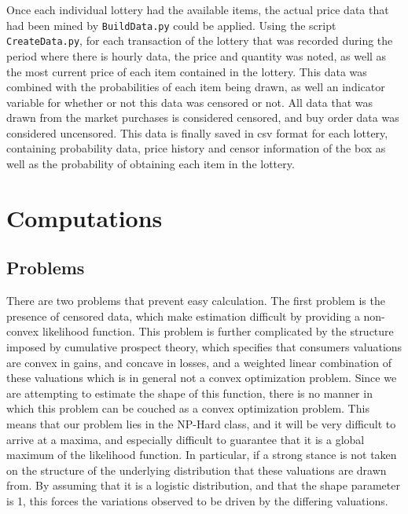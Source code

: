 \documentclass[12pt, letterpaper]{paper}
\begin{document}
Once each individual lottery had the available items, the actual price
data that had been mined by \texttt{BuildData.py} could be applied. Using the
script \texttt{CreateData.py}, for each transaction of the lottery that was
recorded during the period where there is hourly data, the price and
quantity was noted, as well as the most current price of each item
contained in the lottery. This data was combined with the
probabilities of each item being drawn, as well an indicator variable
for whether or not this data was censored or not. All data that was
drawn from the market purchases is considered censored, and buy order
data was considered uncensored. This data is finally saved in csv
format for each lottery, containing probability data, price history
and censor information of the box as well as the probability of
obtaining each item in the lottery.

\section{Computations}
\label{sec-4}
\subsection{Problems}
\label{sec-4-1}
There are two problems that prevent easy calculation. The first
problem is the presence of censored data, which make estimation
difficult by providing a non-convex likelihood function. This problem
is further complicated by the structure imposed by cumulative prospect
theory, which specifies that consumers valuations are convex in gains,
and concave in losses, and a weighted linear combination of these
valuations which is in general not a convex optimization
problem. Since we are attempting to estimate the shape of this
function, there is no manner in which this problem can be couched as a
convex optimization problem. This means that our problem lies in the
NP-Hard class, and it will be very difficult to arrive at a maxima,
and especially difficult to guarantee that it is a global maximum of
the likelihood function. In particular, if a strong stance is not
taken on the structure of the underlying distribution that these
valuations are drawn from. By assuming that it is a logistic
distribution, and that the shape parameter is 1, this forces the
variations observed to be driven by the differing valuations.
\end{document}
